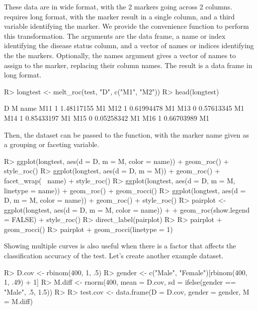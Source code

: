 \documentclass[codesnippet]{jss}
\begin{document}
These data are in wide format, with the 2 markers going across 2
columns.  requires long format, with the marker result in a
single column, and a third variable identifying the marker. We provide
the convenience function  to perform this transformation.
The arguments are the data frame, a name or index identifying the
disease status column, and a vector of names or indices identifying the
the markers. Optionally, the names argument gives a vector of names to
assign to the marker, replacing their column names. The result is a data
frame in long format.

\begin{Schunk}
\begin{Sinput}
R> longtest <- melt_roc(test, "D", c("M1", "M2"))
R> head(longtest)
\end{Sinput}
\begin{Soutput}
    D          M name
M11 1 1.48117155   M1
M12 1 0.61994478   M1
M13 0 0.57613345   M1
M14 1 0.85433197   M1
M15 0 0.05258342   M1
M16 1 0.66703989   M1
\end{Soutput}
\end{Schunk}

Then, the dataset can be passed to the  function, with the
marker name given as a grouping or faceting variable.

\begin{Schunk}
\begin{Sinput}
R> ggplot(longtest, aes(d = D, m = M, color = name)) + geom_roc() + style_roc()
R> ggplot(longtest, aes(d = D, m = M)) + geom_roc() + facet_wrap(~ name) + style_roc()
R> ggplot(longtest, aes(d = D, m = M, linetype = name)) + geom_roc() + geom_rocci()
R> ggplot(longtest, aes(d = D, m = M, color = name)) + geom_roc() + style_roc()
R> pairplot <- ggplot(longtest, aes(d = D, m = M, color = name)) + 
+   geom_roc(show.legend = FALSE) + style_roc()
R> direct_label(pairplot)
R> 
R> pairplot + geom_rocci()
R> pairplot + geom_rocci(linetype = 1)
\end{Sinput}
\end{Schunk}

Showing multiple curves is also useful when there is a factor that
affects the classification accuracy of the test. Let's create another
example dataset.

\begin{Schunk}
\begin{Sinput}
R> D.cov <- rbinom(400, 1, .5)
R> gender <- c("Male", "Female")[rbinom(400, 1, .49) + 1]
R> M.diff <- rnorm(400, mean = D.cov, sd = ifelse(gender == "Male", .5, 1.5))
R> 
R> test.cov <- data.frame(D = D.cov, gender = gender, M = M.diff)
\end{Sinput}
\end{Schunk}
\end{document}
